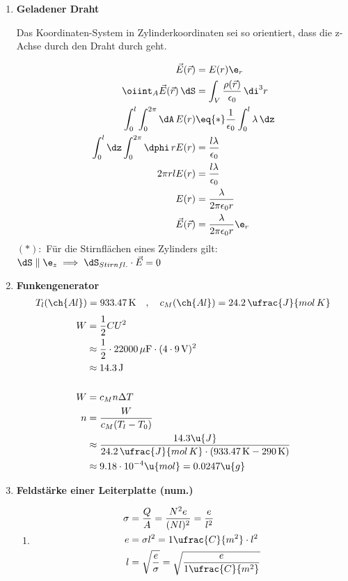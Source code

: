 \documentclass[11pt,letterpaper]{article}
\begin{document}
\begin{enumerate}
    \item \textbf{Geladener Draht}
    
    Das Koordinaten-System in Zylinderkoordinaten sei so orientiert, dass die z-Achse durch den Draht
    durch geht.

    \begin{align*}
        \vec{E}(\vec{r}) &= E(r)\e_r\\
        \oiint_A \vec{E}(\vec{r})\,\dS
        &= \int_{V}\frac{\rho(\vec{r})}{\epsilon_0} \,\di^3r
        \\
        \int_{0}^{l} \int_{0}^{2\pi}\dA\, E(r)
        &\eq{*} \frac{1}{\epsilon_0} \int_0^l \lambda \,\dz\\
        \int_{0}^{l} \dz\int_{0}^{2\pi}\dphi\,r E(r)
        &= \frac{l \lambda}{\epsilon_0} \\
        2\pi r l E(r) &=  \frac{l \lambda}{\epsilon_0} \\
        E(r) &=  \frac{\lambda}{2\pi \epsilon_0  r} \\
        \vec{E}(\vec{r}) &=  \frac{\lambda}{2\pi \epsilon_0  r} \e_r\\
    \end{align*}
    $(*):$ Für die Stirnflächen eines Zylinders gilt: $\dS \parallel \e_z\implies \dS_{Stirnfl.}\cdot \vec{E}=0$

    \item \textbf{Funkengenerator}
    \begin{align*}
        T_{l}(\ch{Al}) = 933.47 \,\mathrm{K}\quad ,\quad
        c_M(\ch{Al}) = 24.2 \,\ufrac{J}{mol\,K}
    \end{align*}
    \begin{align*}
        W &= \frac{1}{2} C U^2\\
        &\approx \frac{1}{2} \cdot 22000 \,\mathrm{\mu F} \cdot (4\cdot  9\,\mathrm{V})^2\\
        &\approx 14.3 \, \mathrm{J}\\
        \\
        W &= c_M n \Delta T\\ 
        n &= \frac{W}{c_M  (T_l - T_0)}\\ 
         &\approx \frac{14.3 \u{J}}{24.2 \,\ufrac{J}{mol\,K} 
         \cdot(933.47 \,\mathrm{K} - 290 \,\mathrm{K})}\\
         &\approx 9.18 \cdot 10^{-4}\u{mol}= 0.0247 \u{g}
    \end{align*}
\newpage
    \item \textbf{Feldstärke einer Leiterplatte (num.)}
        \begin{enumerate}
            \item
            \begin{align*}
                \sigma &= \frac{Q}{A}
                = \frac{N^2e}{(Nl )^2}
                = \frac{e}{l^2}\\
                e &= \sigma l^2 = 1\ufrac{C}{m^2}\cdot l^2\\
                l &= \sqrt{\frac{e}{\sigma}} =\sqrt{\frac{e}{1\ufrac{C}{m^2}}} 
            \end{align*}


\end{enumerate}
\end{enumerate}
\end{document}

